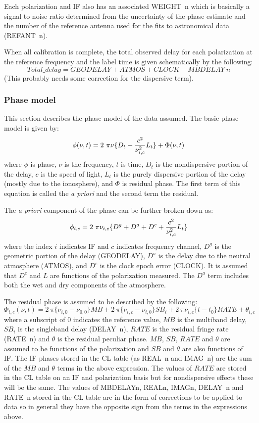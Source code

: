    Each polarization and IF also has an associated WEIGHT~n which is
basically a signal to noise ratio determined from the uncertainty of
the phase estimate and the number of the reference
antenna used for the fits to astronomical data (REFANT~n).  


   When all calibration is complete, the total observed delay for each
polarization at the reference frequency and the label time is given
schematically by the following: 
$$Total\_delay = GEODELAY + ATMOS + CLOCK - MBDELAY~n$$
(This probably needs some correction for the dispersive term).

\subsubsection{Phase model}

   This section describes the phase model of the data assumed.  The
basic phase model is given by:
$$ \phi (\nu,t) = 2\ \pi \nu \{D_t + {{c^2}\over{\nu^2_{i,c}}}L_t\} +
\Phi(\nu,t) $$ 
where $\phi$ is phase, $\nu$ is the frequency, $t$ is time, $D_t$ is the
nondispersive portion of the delay, $c$ is the speed of light, 
$L_t$ is the purely dispersive portion of the delay (mostly due to the
ionosphere), and $\Phi$ is residual phase.
The first term of this equation is called the {\it a priori} and the
second term the residual.

   The {\it a priori} component of the phase can be further broken
down as: 
$$ \phi_{i,c} = 2\ \pi\nu_{i,c} \{D^g + D^a + D^c +
{{c^2}\over{\nu^2_{i,c}}}L_t\} $$
where the index $i$ indicates IF and $c$ indicates frequency channel,
$D^g$ is the geometric portion of the delay (GEODELAY), $D^a$ is the
delay due to the neutral atmosphere (ATMOS), and $D^c$ is the clock
epoch error (CLOCK).  It is 
assumed that $D^c$ and $L$ are functions of the polarization measured.
The $D^a$ term includes both the wet and dry components of the
atmosphere. 

   The residual phase is assumed to be described by the following:
$$\Phi_{i,c}(\nu,t) = 2\ \pi \{\nu_{i,0} - \nu_{0,0}\} MB +
2\ \pi \{\nu_{i,c} - \nu_{i,0}\} SB_i +
2\ \pi \nu_{i,c}\{t-t_0\} RATE +
\theta_{i,c} $$
where a subscript of 0 indicates the reference value, $MB$ is the
multiband delay, $SB_i$ is the singleband delay (DELAY~n), $RATE$ is the
residual fringe rate (RATE~n) and $\theta$ is the residual peculiar phase.
$MB$, $SB$, $RATE$ and $\theta$ are assumed to be functions of the
polarization and $SB$ and $\theta$ are also functions of IF.  The IF
phases stored in the CL table (as REAL~n and IMAG~n) are the sum of the 
$MB$ and $\theta$ terms in the above expression.  The values of $RATE$
are stored in the CL table on an IF and polarization basis but for
nondispersive effects these will be the same.  The values of MBDELAYn,
REALn, IMAGn, DELAY~n and RATE~n stored in the CL table are in the
form of corrections to be applied to data so in general they have the
opposite sign from the terms in the expressions above.

